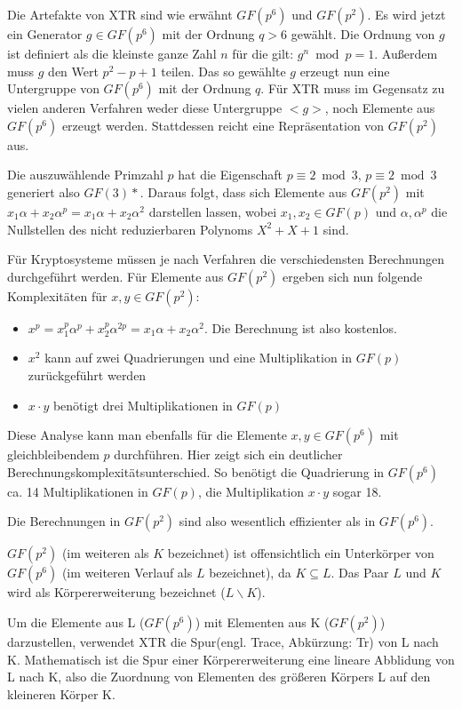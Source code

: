 \documentclass[10pt,        %
               a4paper,     %
               journal,     %
               ]{IEEEtran}
\begin{document}
Die Artefakte von XTR sind wie erwähnt  $GF(p^6)$ und $GF(p^2)$. Es wird jetzt ein Generator $g \in GF(p^6) $ mit der Ordnung $ q > 6$ gewählt. Die Ordnung von $g$ ist definiert als die kleinste ganze Zahl $n$ für die gilt: $g^n \bmod p = 1$. Außerdem muss $g$ den Wert $p^2 - p +1$ teilen. Das so gewählte $g$ erzeugt nun eine Untergruppe von $GF(p^6)$ mit der Ordnung $q$. Für XTR muss im Gegensatz zu vielen anderen Verfahren weder diese Untergruppe $<g>$, noch Elemente aus $GF(p^6)$ erzeugt werden. Stattdessen reicht eine Repräsentation von $GF(p^2)$ aus.

Die auszuwählende Primzahl $p$ hat die Eigenschaft $p \equiv 2 \bmod 3$, $p \equiv 2 \bmod 3$ generiert also $GF(3)*$. Daraus folgt, dass sich Elemente aus $GF(p^2)$ mit $x_1\alpha + x_2\alpha^p = x_1\alpha + x_2\alpha^2 $ darstellen lassen, wobei $x_1,x_2 \in GF(p)$ und $\alpha, \alpha^p$ die Nullstellen des nicht reduzierbaren Polynoms $X^2 + X + 1$ sind.

Für Kryptosysteme müssen je nach Verfahren die verschiedensten Berechnungen durchgeführt werden. Für Elemente aus $GF(p^2)$ ergeben sich nun folgende Komplexitäten für $x,y \in GF(p^2)$:
\begin{itemize}
	\item $x^p = x_1^p\alpha^p + x_2^p\alpha^{2p} = x_1\alpha + x_2\alpha^2$. Die Berechnung ist also kostenlos.
	\item $x^2$ kann auf zwei Quadrierungen und eine Multiplikation in $GF(p)$ zurückgeführt werden
	\item $x \cdot y$ benötigt drei Multiplikationen in $GF(p)$
\end{itemize}
Diese Analyse kann man ebenfalls für die Elemente $x,y \in GF(p^6)$ mit gleichbleibendem $p$ durchführen. Hier zeigt sich ein deutlicher Berechnungskomplexitätsunterschied.
So benötigt die Quadrierung in $GF(p^6)$ ca. 14 Multiplikationen in $GF(p)$, die Multiplikation $x \cdot y$ sogar 18.

Die Berechnungen in $GF(p^2)$ sind also wesentlich effizienter als in $GF(p^6)$.

$GF(p^2)$ (im weiteren als $K$ bezeichnet) ist offensichtlich ein Unterkörper von $GF(p^6)$ (im weiteren Verlauf als $L$ bezeichnet), da $K\subseteq L$.
Das Paar $L$ und $K$ wird als Körpererweiterung bezeichnet ($L\backslash K$).

Um die Elemente aus L ($GF(p^6)$) mit Elementen aus K ($GF(p^2)$) darzustellen, verwendet XTR die Spur(engl. Trace, Abkürzung: Tr) von L nach K. Mathematisch ist die Spur einer Körpererweiterung eine lineare Abblidung von L nach K, also die Zuordnung von Elementen des größeren Körpers L auf den kleineren Körper K. 
\end{document}
